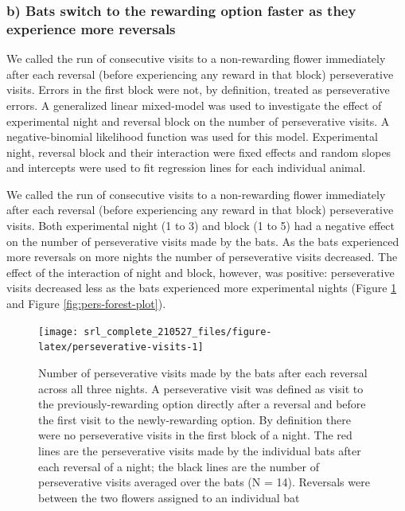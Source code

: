 \documentclass[
]{article}
\begin{document}
\hypertarget{b-bats-switch-to-the-rewarding-option-faster-as-they-experience-more-reversals}{%
\subsubsection{b) Bats switch to the rewarding option faster as they experience more reversals}\label{b-bats-switch-to-the-rewarding-option-faster-as-they-experience-more-reversals}}

We called the run of consecutive visits to a non-rewarding flower immediately after each reversal (before experiencing any reward in that block) perseverative visits. Errors in the first block were not, by definition, treated as perseverative errors. A generalized linear mixed-model was used to investigate the effect of experimental night and reversal block on the number of perseverative visits. A negative-binomial likelihood function was used for this model. Experimental night, reversal block and their interaction were fixed effects and random slopes and intercepts were used to fit regression lines for each individual animal.

We called the run of consecutive visits to a non-rewarding flower immediately after each reversal (before experiencing any reward in that block) perseverative visits. Both experimental night (1 to 3) and block (1 to 5) had a negative effect on the number of perseverative visits made by the bats. As the bats experienced more reversals on more nights the number of perseverative visits decreased. The effect of the interaction of night and block, however, was positive: perseverative visits decreased less as the bats experienced more experimental nights (Figure \ref{fig:perseverative-visits} and Figure \ref{fig:pers-forest-plot}).



\begin{figure}[H]

{\centering \texttt{[image: srl\_complete\_210527\_files/figure-latex/perseverative-visits-1]} 

}

\caption{Number of perseverative visits made by the bats after each reversal across all three nights. A perseverative visit was defined as visit to the previously-rewarding option directly after a reversal and before the first visit to the newly-rewarding option. By definition there were no perseverative visits in the first block of a night. The red lines are the perseverative visits made by the individual bats after each reversal of a night; the black lines are the number of perseverative visits averaged over the bats (N = 14). Reversals were between the two flowers assigned to an individual bat}\label{fig:perseverative-visits}
\end{figure}
\end{document}
